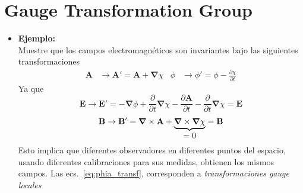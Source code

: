 \section{Gauge Transformation Group}
\begin{itemize}
\item \textbf{Ejemplo:}\\
Muestre que los campos electromagnéticos son invariantes bajo las siguientes transformaciones
\begin{align}
  \label{eq:phia_transf}
  \mathbf{A}&\to\mathbf{A}'=\mathbf{A}+\boldsymbol{\nabla}\chi&
  \phi&\to\phi'=\phi-\frac{\partial\chi}{\partial t} 
\end{align}
Ya que
\begin{equation}
  \label{eq:Etrans}
  \mathbf{E}\to\mathbf{E}'= -\boldsymbol{\nabla}\phi+\frac{\partial}{\partial t}\boldsymbol{\nabla}\chi
  -\frac{\partial\mathbf{A}}{\partial t}-\frac{\partial}{\partial t}\boldsymbol{\nabla}\chi=\mathbf{E}
\end{equation}
\begin{equation}
  \label{eq:btransf}
  \mathbf{B}\to\mathbf{B}'= \boldsymbol{\nabla}\times \mathbf{A}+
  \underbrace{\boldsymbol{\nabla}\times \boldsymbol{\nabla}\chi}_{\displaystyle =0}=\mathbf{B}
\end{equation}
Esto implica que diferentes observadores en diferentes puntos del espacio, usando diferentes calibraciones para sus medidas, obtienen los mismos campos. Las  ecs.~\eqref{eq:phia_transf}, corresponden a \emph{transformaciones gauge locales}

\end{itemize}

